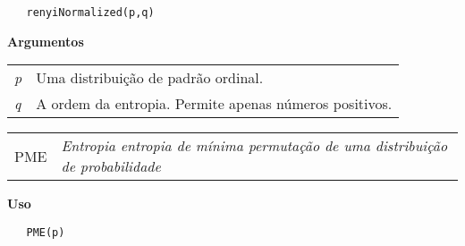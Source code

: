 \documentclass[12pt,letterpaper]{article}
\begin{document}
\begin{lstlisting}
   renyiNormalized(p,q)
\end{lstlisting}

\vspace{0.5cm}

\textbf{Argumentos}

\begin{table}[!h]
\begin{center}
\begin{tabularx}{\textwidth}{X X}
\hspace{0.5cm} \textit{p} \vspace{0.5cm}& Uma distribuição de padrão ordinal.\vspace{0.5cm}\\
\hspace{0.5cm} \textit{q} \vspace{0.5cm}& A ordem da entropia. Permite apenas números positivos.\vspace{0.5cm}\\
\end{tabularx}
\end{center}
\end{table} 


\hrulefill   

\begin{table}[!h]
\begin{center}
\begin{tabularx}{\textwidth}{ X X}
\hspace{0.5cm} PME & \textit{Entropia entropia de mínima permutação de uma distribuição de probabilidade}\\
\end{tabularx}
\end{center}
\end{table} 

\vspace{-0.5cm}

\hrulefill  

\vspace{0.5cm}

\textbf{Uso}

\begin{lstlisting}
   PME(p)
\end{lstlisting}

\vspace{0.5cm}
\end{document}
